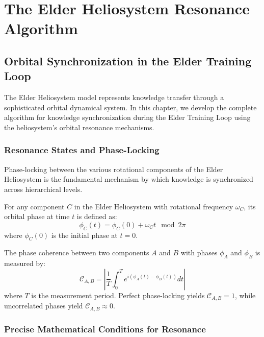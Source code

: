 \chapter{The Elder Heliosystem Resonance Algorithm}

\section{Orbital Synchronization in the Elder Training Loop}

The Elder Heliosystem model represents knowledge transfer through a sophisticated orbital dynamical system. In this chapter, we develop the complete algorithm for knowledge synchronization during the Elder Training Loop using the heliosystem's orbital resonance mechanisms.

\subsection{Resonance States and Phase-Locking}

Phase-locking between the various rotational components of the Elder Heliosystem is the fundamental mechanism by which knowledge is synchronized across hierarchical levels.

\begin{definition}
For any component $C$ in the Elder Heliosystem with rotational frequency $\omega_C$, its orbital phase at time $t$ is defined as:
\begin{equation}
\phi_C(t) = \phi_C(0) + \omega_C t \mod 2\pi
\end{equation}
where $\phi_C(0)$ is the initial phase at $t=0$.
\end{definition}

\begin{definition}
The phase coherence between two components $A$ and $B$ with phases $\phi_A$ and $\phi_B$ is measured by:
\begin{equation}
\mathcal{C}_{A,B} = \left| \frac{1}{T} \int_0^T e^{i(\phi_A(t) - \phi_B(t))} dt \right|
\end{equation}
where $T$ is the measurement period. Perfect phase-locking yields $\mathcal{C}_{A,B} = 1$, while uncorrelated phases yield $\mathcal{C}_{A,B} \approx 0$.
\end{definition}

\subsection{Precise Mathematical Conditions for Resonance}

